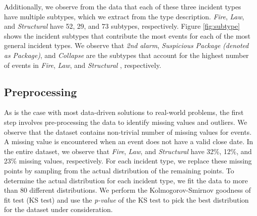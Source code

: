 {Additionally, we observe from the data that each of these three incident types have multiple subtypes, which we extract from the type description.  \textit{Fire}, \textit{Law}, and \textit{Structural} have 52, 29, and 73  subtypes, respectively.  Figure \ref{fig:subtype} shows the  incident subtypes that contribute the most events for each of the most general incident types. We observe that \textit{2nd alarm}, \textit{Suspicious Package (denoted as Package)}, and \textit{Collapse} %
are the subtypes that account for the highest number of events in \textit{Fire}, \textit{Law}, and \textit{Structural}%
, respectively.





\subsection{Preprocessing}
\label{Data:Preprocessing}

As is the case with most data-driven solutions to real-world problems, the first step involves pre-processing the data to identify missing values and outliers.  We observe that the dataset contains non-trivial number of missing values for events. A missing value is encountered when an event does not have  a valid close date. In the entire dataset, we observe that  \textit{Fire}, \textit{Law}, and  \textit{Structural} have 32\%, 12\%, and 23\%  missing values, respectively.  For each incident type, we replace these missing points by sampling from the actual distribution of the remaining points. To determine the actual distribution for each incident type, we fit the data to more than 80 different distributions. We perform  the Kolmogorov-Smirnov  goodness of fit test (KS test) and use the \textit{p-value} of the KS test to pick the best distribution for the dataset under consideration. 





}
